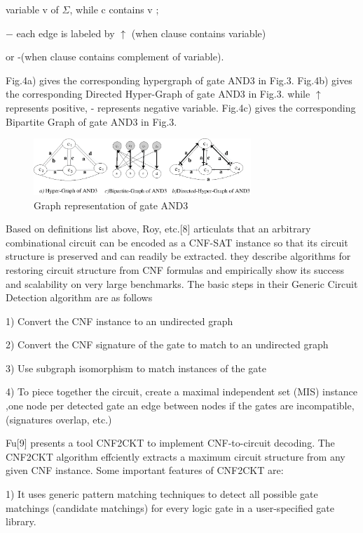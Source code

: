 \documentclass[runningheads,a4paper]{llncs}
\begin{document}
\setlength{\parindent}{5em}  variable v of $\Sigma$, while c contains v ;

\setlength{\parindent}{4em} $-$ each edge is labeled by  $\uparrow$ (when clause contains variable) 

\setlength{\parindent}{5em} or -(when clause contains complement of variable).

\setlength{\parindent}{2em} 

Fig.4a) gives the corresponding hypergraph of gate AND3 in Fig.3. 
Fig.4b) gives the corresponding Directed Hyper-Graph of gate AND3 in Fig.3. while $\uparrow$ represents positive, - represents negative variable.
Fig.4c) gives the corresponding Bipartite Graph of gate AND3 in Fig.3.
\begin{figure}
\centering
\includegraphics[width=8.2cm]{a4}
\caption{Graph representation of gate AND3}
\end{figure}

Based on definitions list above, Roy, etc.[8] articulats that an arbitrary combinational circuit can be encoded as a CNF-SAT instance 
so that its circuit structure is preserved and can readily be extracted. 
they describe algorithms for restoring circuit structure from CNF formulas 
and empirically show its success and scalability on very large benchmarks. 
The basic steps in their Generic Circuit Detection algorithm are as follows 

1)	Convert the CNF instance to an undirected graph

2)	Convert the CNF signature of the gate to match to an undirected graph

3)	Use subgraph isomorphism to match instances of the gate

4)	To piece together the circuit, create a maximal independent set (MIS) instance ,one node per detected gate an edge between nodes if the gates are incompatible,(signatures overlap, etc.)

Fu[9] presents a tool CNF2CKT to implement CNF-to-circuit decoding. The CNF2CKT algorithm effciently extracts a maximum circuit structure from any given CNF instance. Some important features of CNF2CKT are:

1) It uses generic pattern matching techniques to detect all possible gate matchings (candidate matchings) for every logic gate in a user-specified gate library.
\end{document}
